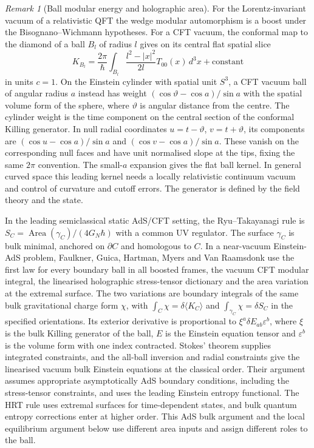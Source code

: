 \documentclass[aps,pra,onecolumn,superscriptaddress,nofootinbib,10pt]{revtex4-2}
\theoremstyle{definition}
\theoremstyle{remark}
\newtheorem{remark}[theorem]{Remark}
\begin{document}
\begin{remark}[Ball modular energy and holographic area]\label{ub:classicalgrav}
For the Lorentz-invariant vacuum of a relativistic QFT the wedge
modular automorphism is a boost under the Bisognano--Wichmann
hypotheses. For a CFT vacuum, the conformal map to the diamond of
a ball $B_l$ of radius $l$ gives on its central flat spatial slice
\[
 K_{B_l}=\frac{2\pi}{\hbar}\int_{B_l}\frac{l^2-|x|^2}{2l}
               T_{00}(x)\,d^3x+\text{constant}
\]
in units $c=1$. On the Einstein cylinder with spatial unit
$S^3$, a CFT vacuum ball of angular radius $a$ instead has weight
$(\cos\vartheta-\cos a)/\sin a$ with the spatial volume form of
the sphere, where $\vartheta$ is angular distance from the centre.
The cylinder weight is the time component on the central section of
the conformal Killing generator. In null radial coordinates
$u=t-\vartheta$, $v=t+\vartheta$, its components are
$(\cos u-\cos a)/\sin a$ and $(\cos v-\cos a)/\sin a$.
These vanish on the corresponding null faces and have unit
normalised slope at the tips, fixing the same $2\pi$ convention.
The small-$a$ expansion gives the flat ball kernel.
In general curved space this leading kernel needs a locally
relativistic continuum vacuum and control of curvature and cutoff
errors. The generator is defined by the field theory and the state.
\cite{n1-bw,ub:chm}

In the leading semiclassical static AdS/CFT setting, the
Ryu--Takayanagi rule is
$S_C=\operatorname{Area}(\gamma_C)/(4G_N\hbar)$ with a common
UV regulator. The surface $\gamma_C$ is bulk minimal, anchored on
$\partial C$ and homologous to $C$. In a near-vacuum Einstein-AdS
problem, Faulkner, Guica, Hartman, Myers and Van Raamsdonk use the
first law for every boundary ball in all boosted frames, the vacuum
CFT modular integral, the linearised holographic stress-tensor
dictionary and the area variation at the extremal surface. The
two variations are boundary integrals of the same bulk gravitational
charge form $\chi$, with $\int_C\chi=\delta\langle K_C\rangle$ and
$\int_{\gamma_C}\chi=\delta S_C$ in the specified orientations.
Its exterior derivative is proportional to
$\xi^a\delta E_{ab}\varepsilon^b$, where $\xi$ is the bulk Killing
generator of the ball, $E$ is the Einstein equation tensor and
$\varepsilon^b$ is the volume form with one index contracted. Stokes' theorem supplies integrated constraints, and the
all-ball inversion and radial constraints give the linearised vacuum
bulk Einstein equations at the classical order. Their argument assumes
appropriate asymptotically AdS boundary conditions, including the
stress-tensor constraints, and uses the leading Einstein entropy
functional. The HRT rule uses extremal surfaces for time-dependent
states, and bulk quantum entropy corrections enter at higher order.
This AdS bulk argument and the local equilibrium argument below use
different area inputs and assign different roles to the ball.


\end{remark}
\end{document}
